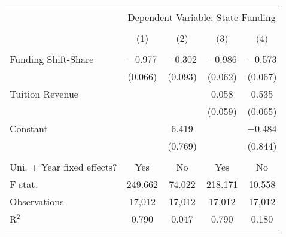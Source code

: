 
\begin{tabular}{@{\extracolsep{5pt}}lcccc} 
\\[-1.8ex]\hline 
\hline \\[-1.8ex] 
 & \multicolumn{4}{c}{Dependent Variable: State Funding} \\ 
\cline{2-5} 
\\[-1.8ex] & (1) & (2) & (3) & (4)\\ 
\hline \\[-1.8ex] 
 Funding Shift-Share & $-$0.977 & $-$0.302 & $-$0.986 & $-$0.573 \\ 
  & (0.066) & (0.093) & (0.062) & (0.067) \\ 
  Tuition Revenue &  &  & 0.058 & 0.535 \\ 
  &  &  & (0.059) & (0.065) \\ 
  Constant &  & 6.419 &  & $-$0.484 \\ 
  &  & (0.769) &  & (0.844) \\ 
 \hline \\[-1.8ex] 
Uni. + Year fixed effects? & Yes & No & Yes & No \\ 
F stat. & 249.662 & 74.022 & 218.171 & 10.558 \\ 
Observations & 17,012 & 17,012 & 17,012 & 17,012 \\ 
R$^{2}$ & 0.790 & 0.047 & 0.790 & 0.180 \\ 
\hline 
\hline \\[-1.8ex] 
\end{tabular} 
